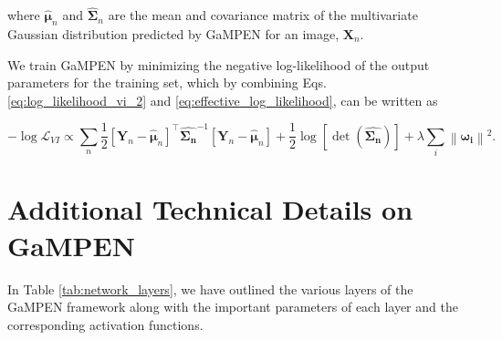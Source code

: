 \documentclass[twocolumn]{aastex63}
\newcommand\gampen{GaMPEN}
\begin{document}
\begin{CJK*}{UTF8}{gbsn}
\noindent
where $\boldsymbol{\hat{\mu}}_n$ and $\boldsymbol{\hat{\Sigma}}_n$ are the mean and covariance matrix of the multivariate Gaussian distribution predicted by \gampen{} for an image, $\boldsymbol{X}_n$. 

We train \gampen{} by minimizing the negative log-likelihood of the output parameters for the training set, which by combining Eqs. \ref{eq:log_likelihood_vi_2} and \ref{eq:effective_log_likelihood}, can be written as

\begin{equation}
- \log \mathcal{L}_{VI} \propto  \sum_{n} \frac{1}{2}\left[\boldsymbol{Y}_{n}-\boldsymbol{\hat{\mu}}_{n}\right]^{\top} \boldsymbol{\hat{\Sigma_n}}^{-1}\left[\boldsymbol{Y}_{n}-\boldsymbol{\hat{\mu}}_{n}\right] + \frac{1}{2} \log [\operatorname{det}(\boldsymbol{\hat{\Sigma_n}})] + \lambda \sum_{i}\left\|\boldsymbol{\omega_{i}}\right\|^{2} .
\label{eq:ap:final_loss_fn}
\end{equation}

\section{Additional Technical Details on \gampen{}}

In Table \ref{tab:network_layers}, we have outlined the various layers of the \gampen{} framework along with the important parameters of each layer and the corresponding activation functions.


\end{CJK*}
\end{document}
